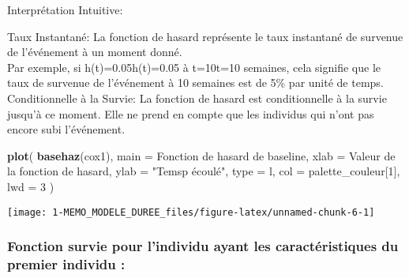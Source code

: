 \documentclass[
]{article}
\newenvironment{Shaded}{\begin{snugshade}}{\end{snugshade}}
\newcommand{\AttributeTok}[1]{\textcolor[rgb]{0.13,0.29,0.53}{#1}}
\newcommand{\DecValTok}[1]{\textcolor[rgb]{0.00,0.00,0.81}{#1}}
\newcommand{\FunctionTok}[1]{\textcolor[rgb]{0.13,0.29,0.53}{\textbf{#1}}}
\newcommand{\NormalTok}[1]{#1}
\newcommand{\StringTok}[1]{\textcolor[rgb]{0.31,0.60,0.02}{#1}}
\begin{document}
Interprétation Intuitive:

Taux Instantané: La fonction de hasard représente le taux instantané de
survenue de l'événement à un moment donné.\\
Par exemple, si h(t)=0.05h(t)=0.05 à t=10t=10 semaines, cela signifie
que le taux de survenue de l'événement à 10 semaines est de 5\% par
unité de temps.\\
Conditionnelle à la Survie: La fonction de hasard est conditionnelle à
la survie jusqu'à ce moment. Elle ne prend en compte que les individus
qui n'ont pas encore subi l'événement.

\begin{Shaded}
\begin{Highlighting}[]
\FunctionTok{plot}\NormalTok{(}
  \FunctionTok{basehaz}\NormalTok{(cox1),}
  \AttributeTok{main =} \StringTok{\textquotesingle{}Fonction de hasard de baseline\textquotesingle{}}\NormalTok{,}
  \AttributeTok{xlab =} \StringTok{\textquotesingle{}Valeur de la fonction de hasard\textquotesingle{}}\NormalTok{,}
  \AttributeTok{ylab =} \StringTok{"Temsp écoulé"}\NormalTok{,}
  \AttributeTok{type =} \StringTok{\textquotesingle{}l\textquotesingle{}}\NormalTok{,}
  \AttributeTok{col =}\NormalTok{ palette\_couleur[}\DecValTok{1}\NormalTok{],}
  \AttributeTok{lwd =} \DecValTok{3}
\NormalTok{)}
\end{Highlighting}
\end{Shaded}

\begin{center}\texttt{[image: 1-MEMO\_MODELE\_DUREE\_files/figure-latex/unnamed-chunk-6-1]} \end{center}

\hypertarget{fonction-survie-pour-lindividu-ayant-les-caractuxe9ristiques-du-premier-individu}{%
\subsubsection{Fonction survie pour l'individu ayant les
caractéristiques du premier individu
:}\label{fonction-survie-pour-lindividu-ayant-les-caractuxe9ristiques-du-premier-individu}}
\end{document}
